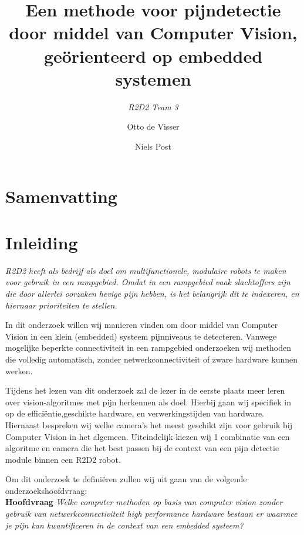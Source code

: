 \documentclass[11pt]{article}
\title{Een methode voor pijndetectie door middel van Computer Vision, geörienteerd op embedded systemen}
\author{\emph{R2D2 Team 3} \and Otto de Visser \and Niels Post}
\begin{document}
    \maketitle

    \clearpage
    \renewcommand{\contentsname}{Inhoudsopgave}
    \tableofcontents

    \clearpage


    \section{Samenvatting}


    \section{Inleiding}
    \emph{R2D2 heeft als bedrijf als doel om multifunctionele, modulaire robots te maken voor gebruik in een rampgebied.
    Omdat in een rampgebied vaak slachtoffers zijn die door allerlei oorzaken hevige pijn hebben,
    is het belangrijk dit te indexeren, en hiernaar prioriteiten te stellen.}

    In dit onderzoek willen wij manieren vinden om door middel van Computer Vision in een klein (embedded) systeem pijnniveaus
    te detecteren.
    Vanwege mogelijke beperkte connectiviteit in een rampgebied onderzoeken wij methoden die volledig automatisch,
    zonder netwerkconnectiviteit of zware hardware kunnen werken.

    Tijdens het lezen van dit onderzoek zal de lezer in de eerste plaats meer leren over vision-algoritmes met pijn
    herkennen als doel.
    Hierbij gaan wij specifiek in op de efficiëntie,geschikte hardware, en verwerkingstijden van hardware.
    Hiernaast bespreken wij welke camera’s het meest geschikt zijn voor gebruik bij Computer Vision in het algemeen.
    Uiteindelijk kiezen wij 1 combinatie van een algoritme en camera die het best passen bij de context van een pijn
    detectie module binnen een R2D2 robot.


    Om dit onderzoek te definiëren zullen wij uit gaan van de volgende onderzoekshoofdvraag:\\

    \textbf{Hoofdvraag} \hspace{5} \emph{Welke computer methoden op basis van computer vision zonder gebruik van netwerkconnectiviteit high
    performance hardware bestaan er waarmee je pijn kan kwantificeren in de context van een embedded systeem?}

    \bigskip
\end{document}
